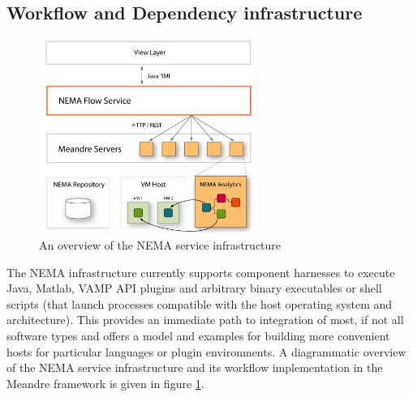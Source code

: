 \documentclass[conference]{IEEEtran}
\begin{document}
\subsection{Workflow and Dependency infrastructure}
\begin{figure}[!t]
\centering
\includegraphics[width=2.8in]{infrastructure}
  \caption{An overview of the NEMA service infrastructure}
\label{fig_infrastructure}
\end{figure}
The NEMA infrastructure currently supports component harnesses to execute Java, Matlab, VAMP API plugins \cite{cannam2006sonic} and arbitrary binary executables or shell scripts (that launch processes compatible with the host operating system and architecture). This provides an immediate path to integration of most, if not all software types and offers a model and examples for building more convenient hosts for particular languages or plugin environments. A diagrammatic overview of the NEMA service infrastructure and its workflow implementation in the Meandre framework is given in figure \ref{fig_infrastructure}.
\end{document}
